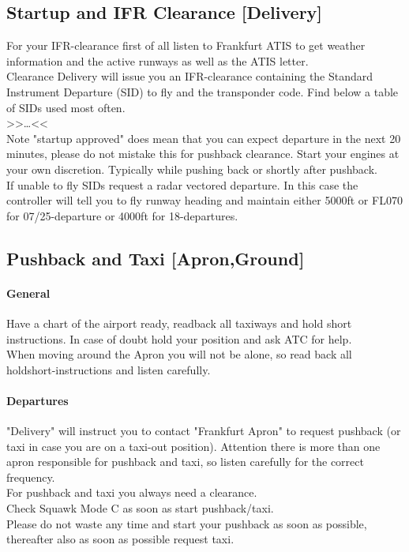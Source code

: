 \subsection[DEL]{Startup and IFR Clearance [Delivery]}
For your IFR-clearance first of all listen to Frankfurt ATIS to
get weather information and the active runways as well as
the ATIS letter.\\
Clearance Delivery will issue you an IFR-clearance containing the Standard Instrument Departure (SID) to fly and the transponder code. Find below a table of SIDs used most often.\\
>>\dots<<
\\
Note "startup approved" does mean that you can expect departure in the next 20 minutes, please do not mistake this for pushback clearance. Start your engines at your own discretion. Typically while pushing back or shortly after
pushback.\\
If unable to fly SIDs request a radar vectored departure. In this case the controller will tell you to fly runway heading and maintain either 5000ft or FL070 for 07/25-departure or
4000ft for 18-departures.\\

\subsection[GND]{Pushback and Taxi [Apron,Ground]}
\paragraph{General}
Have a chart of the airport ready, readback all taxiways and hold short instructions. In case of doubt hold your position and ask ATC for help.\\
When moving around the Apron you will not be alone, so read back all holdshort-instructions and listen carefully.

\paragraph{Departures}
"Delivery" will instruct you to contact "Frankfurt Apron" to request pushback (or taxi in case you are on a taxi-out position). Attention there is more than one apron responsible for pushback and taxi, so listen carefully for the correct frequency.\\ For pushback and taxi you always need a clearance.\\
Check Squawk Mode C as soon as start pushback/taxi.\\
Please do not waste any time and start your pushback as soon as possible, thereafter also as soon as possible request taxi.

